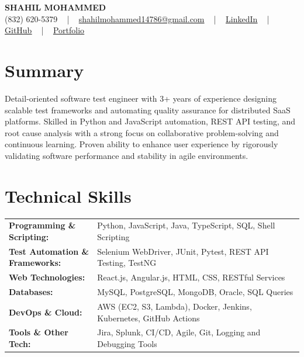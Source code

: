 \documentclass[letterpaper,11pt]{article}
\begin{document}
\begin{center}
    {\fontsize{14pt}{12pt}\selectfont \textbf{\MakeUppercase{Shahil Mohammed}}}\\ \vspace{2pt}
    \fontsize{10pt}{12pt}\selectfont (832) 620-5379 ~ | ~ \href{mailto:shahilmohammed14786@gmail.com}{shahilmohammed14786@gmail.com} ~ | ~  
    \href{https://www.linkedin.com/in/shahil-mohammed-9652931a1/}{\color{blue}\underline{LinkedIn}}  ~ | ~ 
    \href{https://github.com/freakbeast14}{\color{blue}\underline{GitHub}} ~ | ~ 
    \href{https://shahil-mohammed.netlify.app/}{\color{blue}\underline{Portfolio}}
    \vspace{-8pt}
\end{center}

\section{Summary}
\fontsize{9pt}{10pt}\selectfont
Detail-oriented software test engineer with 3+ years of experience designing scalable test frameworks and automating quality assurance for distributed SaaS platforms. Skilled in Python and JavaScript automation, REST API testing, and root cause analysis with a strong focus on collaborative problem-solving and continuous learning. Proven ability to enhance user experience by rigorously validating software performance and stability in agile environments.
 \vspace{-5pt}
 
\section{Technical Skills}
        \vspace{-14pt}
        \begin{table}[h]
            \fontsize{9pt}{10pt}\selectfont
            \begin{tabular}{p{0.3\linewidth} p{0.7\linewidth}}
                \textbf{Programming \& Scripting:} & Python, JavaScript, Java, TypeScript, SQL, Shell Scripting \\
                \textbf{Test Automation \& Frameworks:} & Selenium WebDriver, JUnit, Pytest, REST API Testing, TestNG \\
                \textbf{Web Technologies:} & React.js, Angular.js, HTML, CSS, RESTful Services \\
                \textbf{Databases:} & MySQL, PostgreSQL, MongoDB, Oracle, SQL Queries \\
                \textbf{DevOps \& Cloud:} & AWS (EC2, S3, Lambda), Docker, Jenkins, Kubernetes, GitHub Actions \\
                \textbf{Tools \& Other Tech:} & Jira, Splunk, CI/CD, Agile, Git, Logging and Debugging Tools \\
            \end{tabular}
        \end{table}
 \vspace{-15pt}
 
\end{document}
